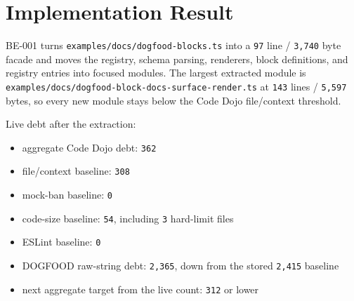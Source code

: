 \section{Implementation Result}\label{record-253-implementation-result}

BE-001 turns \texttt{e\allowbreak{}x\allowbreak{}a\allowbreak{}m\allowbreak{}p\allowbreak{}l\allowbreak{}e\allowbreak{}s\allowbreak{}/\allowbreak{}d\allowbreak{}o\allowbreak{}c\allowbreak{}s\allowbreak{}/\allowbreak{}d\allowbreak{}o\allowbreak{}g\allowbreak{}f\allowbreak{}o\allowbreak{}o\allowbreak{}d\allowbreak{}-\allowbreak{}b\allowbreak{}l\allowbreak{}o\allowbreak{}c\allowbreak{}k\allowbreak{}s\allowbreak{}.\allowbreak{}t\allowbreak{}s} into a \texttt{9\allowbreak{}7} line / \texttt{3\allowbreak{},\allowbreak{}7\allowbreak{}4\allowbreak{}0} byte facade and moves the registry, schema parsing, renderers, block definitions, and registry entries into focused modules. The largest extracted module is \texttt{e\allowbreak{}x\allowbreak{}a\allowbreak{}m\allowbreak{}p\allowbreak{}l\allowbreak{}e\allowbreak{}s\allowbreak{}/\allowbreak{}d\allowbreak{}o\allowbreak{}c\allowbreak{}s\allowbreak{}/\allowbreak{}d\allowbreak{}o\allowbreak{}g\allowbreak{}f\allowbreak{}o\allowbreak{}o\allowbreak{}d\allowbreak{}-\allowbreak{}b\allowbreak{}l\allowbreak{}o\allowbreak{}c\allowbreak{}k\allowbreak{}-\allowbreak{}d\allowbreak{}o\allowbreak{}c\allowbreak{}s\allowbreak{}-\allowbreak{}s\allowbreak{}u\allowbreak{}r\allowbreak{}f\allowbreak{}a\allowbreak{}c\allowbreak{}e\allowbreak{}-\allowbreak{}r\allowbreak{}e\allowbreak{}n\allowbreak{}d\allowbreak{}e\allowbreak{}r\allowbreak{}.\allowbreak{}t\allowbreak{}s} at \texttt{1\allowbreak{}4\allowbreak{}3} lines / \texttt{5\allowbreak{},\allowbreak{}5\allowbreak{}9\allowbreak{}7} bytes, so every new module stays below the Code Dojo file/context threshold.

Live debt after the extraction:

\begin{itemize}
\tightlist
\item
  aggregate Code Dojo debt: \texttt{3\allowbreak{}6\allowbreak{}2}
\item
  file/context baseline: \texttt{3\allowbreak{}0\allowbreak{}8}
\item
  mock-ban baseline: \texttt{0}
\item
  code-size baseline: \texttt{5\allowbreak{}4}, including \texttt{3} hard-limit files
\item
  ESLint baseline: \texttt{0}
\item
  DOGFOOD raw-string debt: \texttt{2\allowbreak{},\allowbreak{}3\allowbreak{}6\allowbreak{}5}, down from the stored \texttt{2\allowbreak{},\allowbreak{}4\allowbreak{}1\allowbreak{}5} baseline
\item
  next aggregate target from the live count: \texttt{3\allowbreak{}1\allowbreak{}2} or lower
\end{itemize}

